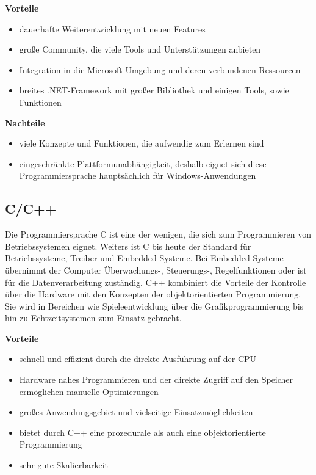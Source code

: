 \textbf{Vorteile}
\begin{itemize}
	\item dauerhafte Weiterentwicklung mit neuen Features
	\item große Community, die viele Tools und Unterstützungen anbieten
	\item Integration in die Microsoft Umgebung und deren verbundenen Ressourcen
	\item breites .NET-Framework mit großer Bibliothek und einigen Tools, sowie Funktionen
\end{itemize}

\textbf{Nachteile}
\begin{itemize}
	\item viele Konzepte und Funktionen, die aufwendig zum Erlernen sind
	\item eingeschränkte Plattformunabhängigkeit, deshalb eignet sich diese Programmiersprache hauptsächlich für Windows-Anwendungen
\end{itemize}

\subsection{C/C++}
Die Programmiersprache C ist eine der wenigen, die sich zum Programmieren von Betriebssystemen eignet. Weiters ist C bis heute der Standard für Betriebssysteme, Treiber und Embedded Systeme. Bei Embedded Systeme übernimmt der Computer Überwachungs-, Steuerungs-, Regelfunktionen oder ist für die Datenverarbeitung zuständig. C++ kombiniert die Vorteile der Kontrolle über die Hardware mit den Konzepten der objektorientierten Programmierung. Sie wird in Bereichen wie Spieleentwicklung über die Grafikprogrammierung bis hin zu Echtzeitsystemen zum Einsatz gebracht. \parencite{Programmiersprachen}

\textbf{Vorteile}
\begin{itemize}
	\item schnell und effizient durch die direkte Ausführung auf der CPU
	\item Hardware nahes Programmieren und der direkte Zugriff auf den Speicher ermöglichen manuelle Optimierungen
	\item großes Anwendungsgebiet und vielseitige Einsatzmöglichkeiten
	\item bietet durch C++ eine prozedurale als auch eine objektorientierte Programmierung
	\item sehr gute Skalierbarkeit
\end{itemize}

